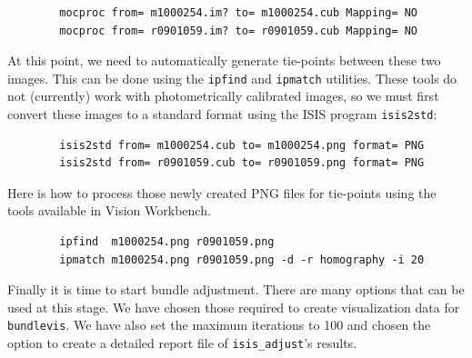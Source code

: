 \begin{verbatim}
        mocproc from= m1000254.im? to= m1000254.cub Mapping= NO
        mocproc from= r0901059.im? to= r0901059.cub Mapping= NO
\end{verbatim}

At this point, we need to automatically generate tie-points between
these two images.  This can be done using the \texttt{ipfind} and
\texttt{ipmatch} utilities.  These tools do not (currently) work
with photometrically calibrated images, so we must first convert
these images to a standard format using the ISIS program \texttt{isis2std}:

\begin{verbatim}
        isis2std from= m1000254.cub to= m1000254.png format= PNG
        isis2std from= r0901059.cub to= r0901059.png format= PNG
\end{verbatim}

Here is how to process those newly created PNG files for tie-points
using the tools available in Vision Workbench.

\begin{verbatim}
        ipfind  m1000254.png r0901059.png
        ipmatch m1000254.png r0901059.png -d -r homography -i 20
\end{verbatim}

\begin{center}
\end{center}

Finally it is time to start bundle adjustment. There are many options
that can be used at this stage.  We have chosen those required to
create visualization data for \texttt{bundlevis}.  We have also set
the maximum iterations to 100 and chosen the option to create a
detailed report file of \texttt{isis\_adjust}'s results.

